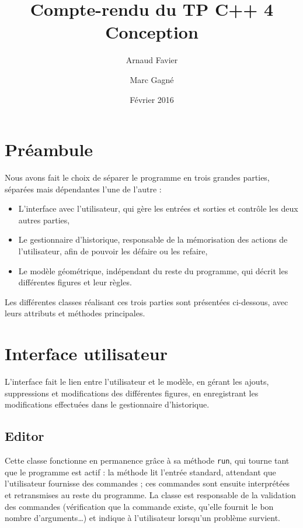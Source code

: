 \documentclass[11pt,a4paper]{article}
\begin{document}
	
	\title{
		Compte-rendu du TP C++ 4\\
		Conception
	}
	\author{
		Arnaud Favier\\
		\and
		Marc Gagné
	}
	\date{Février 2016}
	\maketitle
	
	\section*{Préambule}
	Nous avons fait le choix de séparer le programme en trois grandes parties, séparées mais dépendantes l'une de l'autre :
	\begin{itemize}
		\item L'interface avec l'utilisateur, qui gère les entrées et sorties et contrôle les deux autres parties,
		\item Le gestionnaire d'historique, responsable de la mémorisation des actions de l'utilisateur, afin de pouvoir les défaire ou les refaire,
		\item Le modèle géométrique, indépendant du reste du programme, qui décrit les différentes figures et leur règles.
	\end{itemize}
	Les différentes classes réalisant ces trois parties sont présentées ci-dessous, avec leurs attributs et méthodes principales.
	
	\section{Interface utilisateur}
	L'interface fait le lien entre l'utilisateur et le modèle, en gérant les ajouts, suppressions et modifications des différentes figures, en enregistrant les modifications effectuées dans le gestionnaire d'historique.
	
	\subsection{Editor}
	Cette classe fonctionne en permanence grâce à sa méthode \texttt{run}, qui tourne tant que le programme est actif : la méthode lit l'entrée standard, attendant que l'utilisateur fournisse des commandes ; ces commandes sont ensuite interprétées et retransmises au reste du programme. La classe est responsable de la validation des commandes (vérification que la commande existe, qu'elle fournit le bon nombre d'arguments…) et indique à l'utilisateur lorsqu'un problème survient.
	
\end{document}
